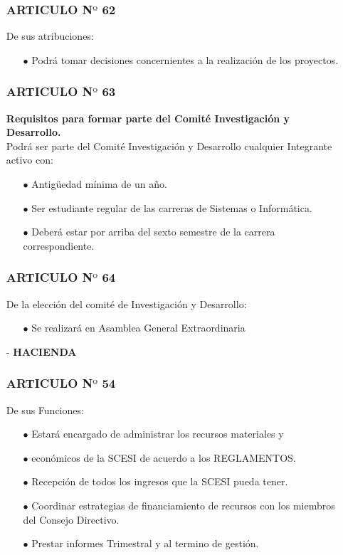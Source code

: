 \documentclass[11pt,letterpaper]{book}
\begin{document}
\begin{itemize}
\subsubsection*{ARTICULO N$º$ 62}
De sus atribuciones:
\begin{itemize}
\item[$\bullet$] Podrá tomar decisiones concernientes a la realización de los proyectos. 
\end{itemize}

\subsubsection*{ARTICULO N$º$ 63}
{\bf Requisitos para formar parte del Comité Investigación y Desarrollo.}\\
Podrá ser parte del Comité Investigación y Desarrollo cualquier Integrante activo con:
\begin{itemize}
\item[$\bullet$] Antigüedad mínima de un año. 
\item[$\bullet$] Ser estudiante regular de las carreras de Sistemas o Informática.  
\item[$\bullet$] Deberá estar por arriba del sexto semestre de la carrera correspondiente. 
\end{itemize}
\subsubsection*{ARTICULO N$º$ 64}
De la elección del comité de Investigación y Desarrollo:
\begin{itemize}
\item[$\bullet$] Se realizará en Asamblea General Extraordinaria 
\end{itemize}
\item[-] {\bf HACIENDA}
\subsubsection*{ARTICULO N$º$ 54}
De sus Funciones:
 \begin{itemize}
\item[$\bullet$] Estará encargado de administrar los recursos materiales y \item[$\bullet$] económicos de la SCESI de acuerdo a los REGLAMENTOS. 
\item[$\bullet$] Recepción de todos los ingresos que la SCESI pueda tener. 
\item[$\bullet$] Coordinar estrategias de financiamiento de recursos con los miembros del Consejo Directivo. 
\item[$\bullet$] Prestar informes Trimestral y al termino de gestión. 
\end{itemize}
 

\end{itemize}
\end{document}

